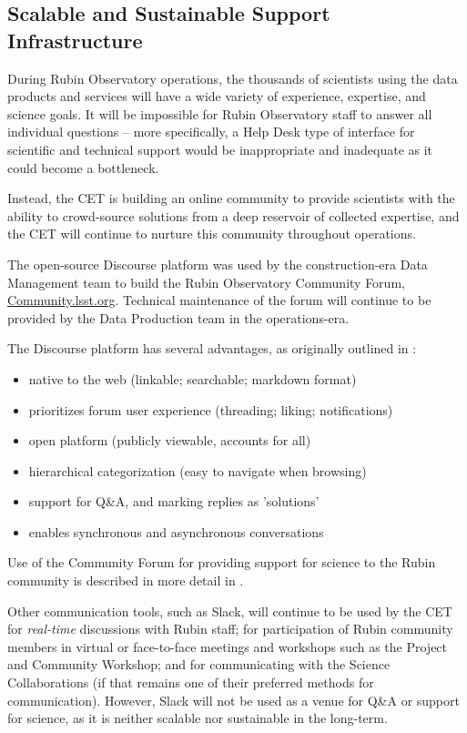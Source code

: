 \documentclass[DM,lsstdraft,toc]{lsstdoc}
\begin{document}
\subsection{Scalable and Sustainable Support Infrastructure}\label{ssec:mod_support}

During Rubin Observatory operations, the thousands of scientists using the data products and services will have a wide variety of experience, expertise, and science goals.
It will be impossible for Rubin Observatory staff to answer all individual questions -- more specifically, a Help Desk type of interface for scientific and technical support would be inappropriate and inadequate as it could become a bottleneck.

Instead, the CET is building an online community to provide scientists with the ability to crowd-source solutions from a deep reservoir of collected expertise, and the CET will continue to nurture this community throughout operations.

The open-source Discourse platform was used by the construction-era Data Management team to build the Rubin Observatory Community Forum, \url{Community.lsst.org}.
Technical maintenance of the forum will continue to be provided by the Data Production team in the operations-era. 

The Discourse platform has several advantages, as originally outlined in :
\begin{itemize}
\item native to the web (linkable; searchable; markdown format)
\item prioritizes forum user experience (threading; liking; notifications)
\item open platform (publicly viewable, accounts for all)
\item hierarchical categorization (easy to navigate when browsing)
\item support for Q\&A, and marking replies as 'solutions'
\item enables synchronous and asynchronous conversations
\end{itemize}

Use of the Community Forum for providing support for science to the Rubin community is described in more detail in .

Other communication tools, such as Slack, will continue to be used by the CET for \textit{real-time} discussions with Rubin staff; for participation of Rubin community members in virtual or face-to-face meetings and workshops such as the Project and Community Workshop; and for communicating with the Science Collaborations (if that remains one of their preferred methods for communication).
However, Slack will not be used as a venue for Q\&A or support for science, as it is neither scalable nor sustainable in the long-term.
\end{document}
